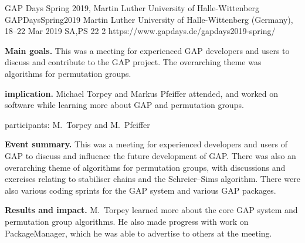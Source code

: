 \begin{event}{GAP Days Spring 2019, Martin Luther University of Halle-Wittenberg}
  {GAPDaysSpring2019}
  {Martin Luther University of Halle-Wittenberg (Germany), 18--22 Mar 2019}
  {SA,PS}
  {22}
  {2}
  {https://www.gapdays.de/gapdays2019-spring/}
  
\textbf{Main goals.} This was a meeting for experienced GAP developers and users
to discuss and contribute to the GAP project.  The overarching theme was
algorithms for permutation groups.

\textbf{\ODK implication.} Michael Torpey and Markus Pfeiffer attended, and
worked on software while learning more about GAP and permutation groups.

\ODK participants: M.~Torpey and M.~Pfeiffer

\textbf{Event summary.} This was a meeting for experienced developers and users
of GAP to discuss and influence the future development of GAP.  There was also
an overarching theme of algorithms for permutation groups, with discussions and
exercises relating to stabiliser chains and the Schreier--Sims algorithm.
There were also various coding sprints for the GAP system and various GAP
packages.

\textbf{Results and impact.} M.~Torpey learned more about the core GAP system
and permutation group algorithms.  He also made progress with work on
PackageManager, which he was able to advertise to others at the meeting.

\end{event}
